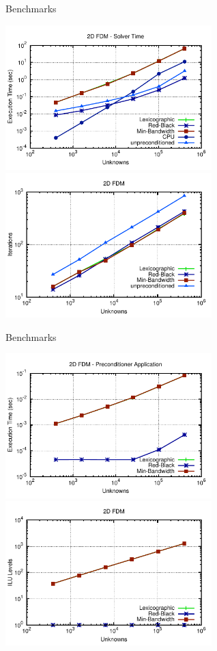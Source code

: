\begin{frame}{Benchmarks}
  \begin{center}
   \vspace*{-0.4cm}
   \includegraphics[width=0.60\textwidth]{figures/fdm2d-solver.pdf} \\[-0.2em]
   \includegraphics[width=0.60\textwidth]{figures/fdm2d-iters.pdf}
  \end{center}
\end{frame}

\begin{frame}{Benchmarks}
  \begin{center}
   \vspace*{-0.4cm}
   \includegraphics[width=0.60\textwidth]{figures/fdm2d-precond.pdf} \\[-0.2em]
   \includegraphics[width=0.60\textwidth]{figures/fdm2d-levels.pdf}
  \end{center}
\end{frame}



